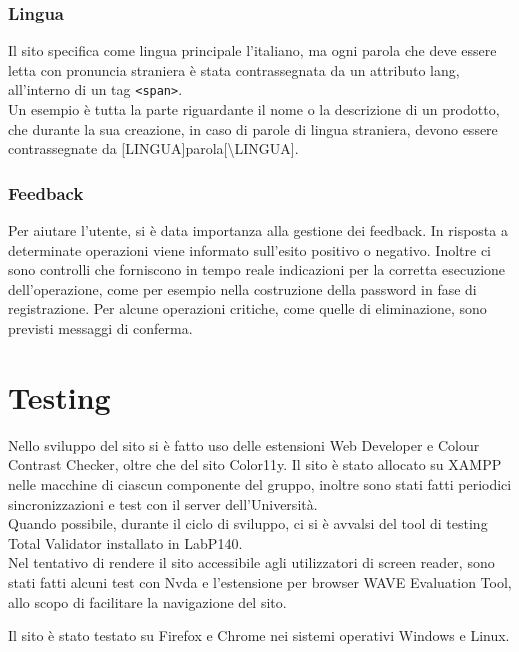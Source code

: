 \documentclass[a4paper, 11pt]{article}
\begin{document}
\subsubsection{Lingua}
Il sito specifica come lingua principale l’italiano, ma ogni parola che deve essere letta con pronuncia straniera è stata contrassegnata da un attributo lang, all’interno di un tag \texttt{<span>}. \\
Un esempio è tutta la parte riguardante il nome o la descrizione di un prodotto, che durante la sua creazione, in caso di parole di lingua straniera,  devono essere contrassegnate da [LINGUA]parola[\textbackslash LINGUA].

\subsubsection{Feedback}
Per aiutare l’utente, si è data importanza alla gestione dei feedback. 
In risposta a determinate operazioni viene informato sull’esito positivo o negativo. Inoltre ci sono controlli che forniscono in tempo reale indicazioni per la corretta esecuzione dell’operazione, come per esempio nella costruzione della password in fase di registrazione. 
Per alcune operazioni critiche, come quelle di eliminazione, sono previsti messaggi di conferma. 


\section{Testing}
Nello sviluppo del sito si è fatto uso delle estensioni Web Developer e Colour Contrast Checker, oltre che del sito Color11y. Il sito è stato allocato su XAMPP nelle macchine di ciascun componente del gruppo, inoltre sono stati fatti periodici sincronizzazioni e test con il server dell’Università. \\
Quando possibile, durante il ciclo di sviluppo, ci si è avvalsi del tool di testing Total Validator installato in LabP140. \\
Nel tentativo di rendere il sito accessibile agli utilizzatori di screen reader, sono stati fatti alcuni test con Nvda e l'estensione per browser WAVE Evaluation Tool, allo scopo di facilitare la navigazione del sito.

Il sito è stato testato su Firefox e Chrome nei sistemi operativi Windows e Linux.
\end{document}
